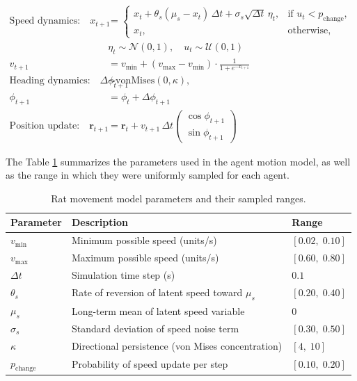 \documentclass{article}
\begin{document}
\begin{align}
\text{Speed dynamics:} \quad
x_{t+1} &=
\begin{cases}
x_t + \theta_s (\mu_s - x_t)\,\Delta t 
      + \sigma_s \sqrt{\Delta t}\,\eta_t, 
      & \text{if } u_t < p_{\mathrm{change}}, \\[6pt]
x_t, & \text{otherwise,}
\end{cases}
\\[6pt]
& \eta_t \sim \mathcal{N}(0,1), 
\quad u_t \sim \mathcal{U}(0,1) \\[6pt]
v_{t+1} &= v_{\min} 
+ (v_{\max} - v_{\min}) \cdot 
  \frac{1}{1 + e^{-x_{t+1}}} \\[10pt]
\text{Heading dynamics:} \quad
\Delta \phi_{t+1} &\sim \mathrm{vonMises}(0, \kappa), \\[4pt]
\phi_{t+1} &= \phi_t + \Delta \phi_{t+1} \\[10pt]
\text{Position update:} \quad
\mathbf{r}_{t+1} &= \mathbf{r}_t + v_{t+1}\,\Delta t
\begin{pmatrix}
\cos \phi_{t+1} \\
\sin \phi_{t+1}
\end{pmatrix}
\end{align}

The Table \ref{table:params} summarizes the parameters used in the agent motion model, as well as the range in which they were uniformly sampled for each agent.

\begin{table}[h!]
\centering
\caption{Rat movement model parameters and their sampled ranges.}
\begin{tabular}{lll}
\toprule
\textbf{Parameter} & \textbf{Description} & \textbf{Range} \\
\midrule
$v_{\min}$ & Minimum possible speed (units/s) & $[0.02,\; 0.10]$ \\
$v_{\max}$ & Maximum possible speed (units/s) & $[0.60,\; 0.80]$ \\
$\Delta t$ & Simulation time step (s) & $0.1$ \\
$\theta_s$ & Rate of reversion of latent speed toward $\mu_s$ & $[0.20,\; 0.40]$ \\
$\mu_s$ & Long-term mean of latent speed variable & $0$ \\
$\sigma_s$ & Standard deviation of speed noise term & $[0.30,\; 0.50]$ \\
$\kappa$ & Directional persistence (von Mises concentration) & $[4, \; 10]$ \\
$p_{\mathrm{change}}$ & Probability of speed update per step & $[0.10,\; 0.20]$ \\
\bottomrule
\end{tabular}
\label{table:params}
\end{table}
\end{document}
